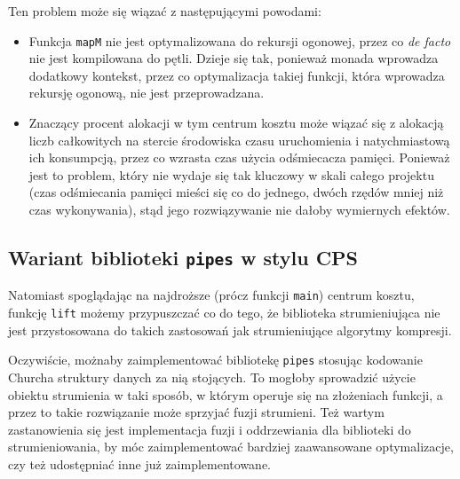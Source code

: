 \documentclass[../../thesis.tex]{subfiles}
\begin{document}
Ten problem może się wiązać z następującymi powodami:
\begin{itemize}
  \item Funkcja \texttt{mapM} nie jest optymalizowana do rekursji ogonowej,
    przez co \emph{de facto} nie jest kompilowana do pętli. Dzieje się tak,
    ponieważ monada wprowadza dodatkowy kontekst, przez co optymalizacja
    takiej funkcji, która wprowadza rekursję ogonową, nie jest przeprowadzana.
  \item Znaczący procent alokacji w tym centrum kosztu może wiązać się z
    alokacją liczb całkowitych na stercie środowiska czasu uruchomienia
    i natychmiastową ich konsumpcją, przez co wzrasta czas użycia odśmiecacza
    pamięci. Ponieważ jest to problem, który nie wydaje się tak kluczowy
    w skali całego projektu (czas odśmiecania pamięci mieści się co do
    jednego, dwóch rzędów mniej niż czas wykonywania), stąd jego rozwiązywanie
    nie dałoby wymiernych efektów.
\end{itemize}

\subsection{Wariant biblioteki \texttt{pipes} w stylu CPS}

Natomiast spoglądając na najdroższe (prócz funkcji \texttt{main}) centrum kosztu,
funkcję \texttt{lift} możemy przypuszczać co do tego, że biblioteka strumieniująca
nie jest przystosowana do takich zastosowań jak strumieniujące algorytmy
kompresji.

Oczywiście, możnaby zaimplementować bibliotekę \texttt{pipes}
stosując kodowanie Churcha struktury danych za nią stojących.
To mogłoby sprowadzić użycie obiektu strumienia w taki sposób, w którym
operuje się na złożeniach funkcji, a przez to takie rozwiązanie może sprzyjać
fuzji strumieni.
Też wartym zastanowienia się jest implementacja fuzji i oddrzewiania
dla biblioteki do strumieniowania, by móc zaimplementować bardziej
zaawansowane optymalizacje, czy też udostępniać inne już zaimplementowane.
\end{document}
